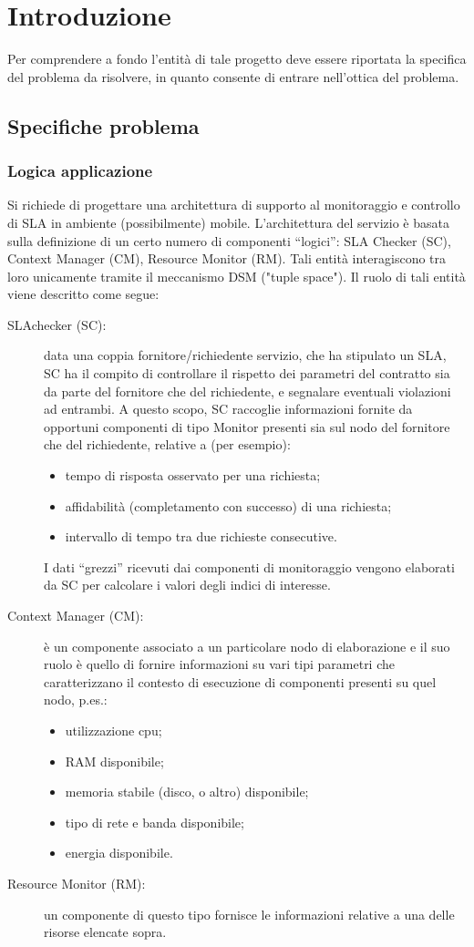\chapter{Introduzione}\label{cap:introduzione}
Per comprendere a fondo l'entità di tale progetto deve essere riportata la specifica del problema da risolvere, in quanto consente di entrare nell'ottica del problema.
\section{Specifiche problema}
\subsection{Logica applicazione}
Si richiede di progettare una architettura di supporto al monitoraggio e controllo di SLA\cite{rif1} in ambiente (possibilmente) mobile. L’architettura del servizio è basata sulla definizione di un certo numero di componenti “logici”: SLA Checker (SC), Context Manager (CM), Resource Monitor (RM). Tali entità interagiscono tra loro unicamente tramite il meccanismo DSM ("tuple space"). Il ruolo di tali entità viene descritto come segue:
\begin{description}
\item[SLAchecker (SC):] data una coppia fornitore/richiedente servizio, che ha stipulato un SLA, SC ha il compito di controllare il rispetto dei parametri del contratto sia da parte del fornitore che del richiedente, e segnalare eventuali violazioni ad entrambi. A questo scopo, SC raccoglie informazioni fornite da opportuni componenti di tipo Monitor presenti sia sul nodo del fornitore che del richiedente, relative a (per esempio):
\begin{itemize}
\item tempo di risposta osservato per una richiesta;
\item affidabilità (completamento con successo) di una richiesta;
\item intervallo di tempo tra due richieste consecutive.
\end{itemize}
I dati “grezzi” ricevuti dai componenti di monitoraggio vengono elaborati da SC per calcolare i valori degli indici di interesse.
\item[Context Manager (CM):] è un componente associato a un particolare nodo di elaborazione e il suo ruolo è quello di fornire informazioni su vari tipi parametri che caratterizzano il contesto di esecuzione di componenti presenti su quel nodo, p.es.:
\begin{itemize}
\item utilizzazione cpu;
\item RAM disponibile;
\item memoria stabile (disco, o altro) disponibile;
\item tipo di rete e banda disponibile;
\item energia disponibile.
\end{itemize}
\item[Resource Monitor (RM):] un componente di questo tipo fornisce le informazioni relative a una delle risorse elencate sopra.
\end{description}
